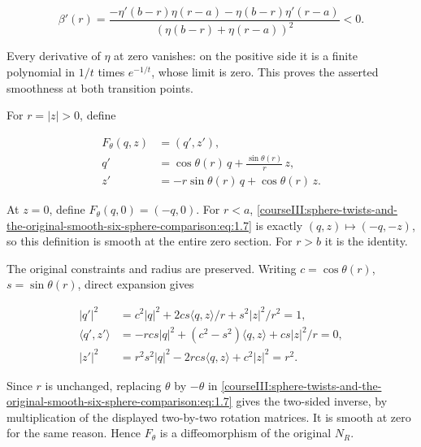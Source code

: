 \begin{equation}
\beta'(r)=
 \frac{-\eta'(b-r)\eta(r-a)-\eta(b-r)\eta'(r-a)}
      {(\eta(b-r)+\eta(r-a))^2}<0 .
 \label{courseIII:sphere-twists-and-the-original-smooth-six-sphere-comparison:eq:1.6}
\end{equation}

Every derivative of \(\eta\) at zero vanishes: on the positive side it is a finite polynomial in \(1/t\) times \(e^{-1/t}\), whose limit is zero. This proves the asserted smoothness at both transition points.

For \(r=|z|>0\), define

\begin{equation}
\begin{split}
 F_\theta(q,z)&=(q',z'),\\
 q'&=\cos\theta(r)\,q+\frac{\sin\theta(r)}r\,z,\\
 z'&=-r\sin\theta(r)\,q+\cos\theta(r)\,z.
 \end{split}
 \label{courseIII:sphere-twists-and-the-original-smooth-six-sphere-comparison:eq:1.7}
\end{equation}

At \(z=0\), define \(F_\theta(q,0)=(-q,0)\). For \(r<a\), \eqref{courseIII:sphere-twists-and-the-original-smooth-six-sphere-comparison:eq:1.7} is exactly \((q,z)\mapsto(-q,-z)\), so this definition is smooth at the entire zero section. For \(r>b\) it is the identity.

The original constraints and radius are preserved. Writing \(c=\cos\theta(r)\), \(s=\sin\theta(r)\), direct expansion gives

\begin{equation}
\begin{split}
 |q'|^2&=c^2|q|^2+2cs\langle q,z\rangle/r+s^2|z|^2/r^2=1,\\
 \langle q',z'\rangle
      &=-rcs|q|^2+(c^2-s^2)\langle q,z\rangle
                                      +cs|z|^2/r=0,\\
 |z'|^2&=r^2s^2|q|^2-2rcs\langle q,z\rangle+c^2|z|^2=r^2 .
 \end{split}
 \label{courseIII:sphere-twists-and-the-original-smooth-six-sphere-comparison:eq:1.8}
\end{equation}

Since \(r\) is unchanged, replacing \(\theta\) by \(-\theta\) in \eqref{courseIII:sphere-twists-and-the-original-smooth-six-sphere-comparison:eq:1.7} gives the two-sided inverse, by multiplication of the displayed two-by-two rotation matrices. It is smooth at zero for the same reason. Hence \(F_\theta\) is a diffeomorphism of the original \(N_R\).

